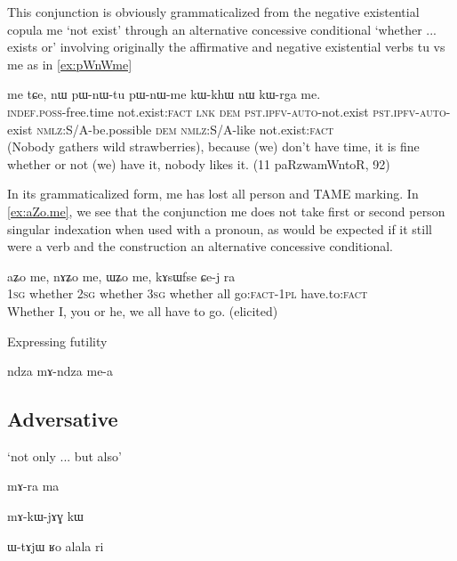 \documentclass[oldfontcommands,oneside,a4paper,11pt]{article}
\newcommand{\ipa}[1]{{\phon #1}} %
\begin{document}
This conjunction is obviously grammaticalized from the negative existential copula \ipa{me} `not exist' through an alternative  concessive conditional `whether ... exists or' involving originally the affirmative and negative existential verbs \ipa{tu} vs \ipa{me} as in \ref{ex:pWnWme}

\begin{exe}
\ex \label{ex:pWnWme}
\gll \ipa{tɤ-ʁa} 	\ipa{me} 	\ipa{tɕe,} 	\ipa{nɯ} 	\ipa{pɯ-nɯ-tu} 	\ipa{pɯ-nɯ-me} 	\ipa{kɯ-khɯ} 	\ipa{nɯ} 	\ipa{kɯ-rga} 	\ipa{me.} \\
\textsc{indef.poss}-free.time not.exist:\textsc{fact} \textsc{lnk} \textsc{dem} \textsc{pst.ipfv-auto}-not.exist \textsc{pst.ipfv-auto}-exist \textsc{nmlz}:S/A-be.possible \textsc{dem} \textsc{nmlz}:S/A-like not.exist:\textsc{fact} \\
\glt (Nobody gathers wild strawberries), because (we) don't have time, it is fine whether or not (we) have it, nobody likes it. (11 paRzwamWntoR, 92)
\end{exe}
 
 In its grammaticalized form, \ipa{me} has lost all person and TAME marking.  In \ref{ex:aZo.me}, we see that the conjunction \ipa{me} does not take first or second person singular indexation when used with a pronoun, as would be expected if it still were a verb and the construction an alternative  concessive conditional.
 
 \begin{exe}
\ex \label{ex:aZo.me}
\gll 
 \ipa{aʑo} 	\ipa{me,} 	\ipa{nɤʑo} 	\ipa{me,} 	\ipa{ɯʑo} 	\ipa{me,} 	\ipa{kɤsɯfse} 	\ipa{ɕe-j} 	\ipa{ra} \\
\textsc{1sg} whether \textsc{2sg} whether \textsc{3sg} whether all go:\textsc{fact}-\textsc{1pl} have.to:\textsc{fact} \\
\glt Whether I, you or he, we all have to go. (elicited)
\end{exe}

Expressing futility

\ipa{ndza} \ipa{mɤ-ndza} \ipa{me-a}

\subsection{Adversative}

`not only ... but also'


\ipa{mɤ-ra ma}

\ipa{mɤ-kɯ-jɤɣ kɯ}

\ipa{ɯ-tɤjɯ}
\ipa{ʁo alala ri}
\end{document}
